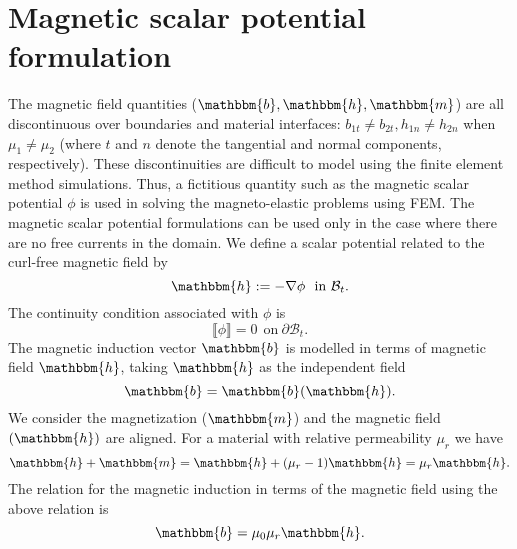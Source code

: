 \section{Magnetic scalar potential formulation}
The magnetic field quantities ($\mathbbm{b}, \mathbbm{h}, \mathbbm{m}$) are all discontinuous over boundaries and material interfaces: $b_{1t} \neq b_{2t}, h_{1n} \neq h_{2n}$ when $\mu_1 \neq \mu_2$ (where $t$ and $n$ denote the tangential and normal components, respectively). These discontinuities are difficult to model using the finite element method simulations. Thus, a fictitious quantity such as the magnetic scalar potential $\phi$ is used in solving the magneto-elastic problems using FEM. The magnetic scalar potential formulations can be used only in the case where there are no free currents in the domain. We define a scalar potential related to the curl-free magnetic field by \cite{pelteret2016}
\begin{equation}
\mathbbm{h} := -\nabla \phi \ \ \text{in} \ \mathcal{B}_t. 
\label{eq:1.5}
\end{equation}
The continuity condition associated with $\phi$ is 
\begin{equation}
\llbracket \phi \rrbracket = 0 \ \ \text{on} \ \partial\mathcal{B}_t.
\end{equation}
The magnetic induction vector $\mathbbm{b}$ is modelled in terms of magnetic field $\mathbbm{h}$, taking $\mathbbm{h}$ as the independent field
\begin{equation}
\mathbbm{b} = \mathbbm{b}(\mathbbm{h}).
\end{equation}
We consider the magnetization ($\mathbbm{m}$) and the magnetic field $(\mathbbm{h})$ are aligned. For a material with relative permeability $\mu_r$ we have
\begin{equation}
\mathbbm{h} + \mathbbm{m} = \mathbbm{h} + (\mu_r - 1)\mathbbm{h} = \mu_r \mathbbm{h}.
\end{equation}
The relation for the magnetic induction in terms of the magnetic field using the above relation is
\begin{equation}
\mathbbm{b} = \mu_0 \mu_r \mathbbm{h}.
\label{eq:1.7}
\end{equation}

